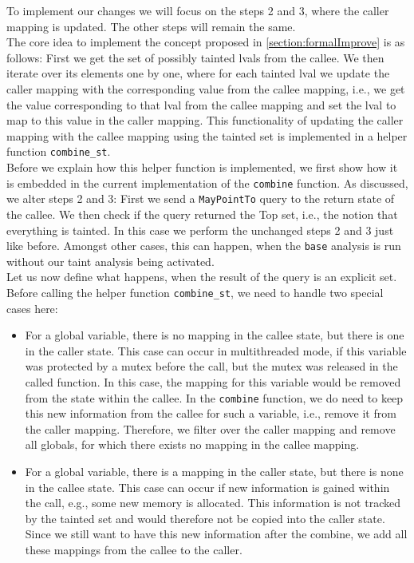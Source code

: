    To implement our changes we will focus on the steps 2 and 3, where the caller mapping is updated. The other steps will remain the same.\\
    The core idea to implement the concept proposed in \autoref{section:formalImprove} is as follows: First we get the set of possibly tainted \ac{lval}s from the callee. We then iterate over its elements one by one, where for each tainted \ac{lval} we update the caller mapping with the corresponding value from the callee mapping, i.e., we get the value corresponding to that \ac{lval} from the callee mapping and set the \ac{lval} to map to this value in the caller mapping. This functionality of updating the caller mapping with the callee mapping using the tainted set is implemented in a helper function \texttt{combine\_st}.\\
    Before we explain how this helper function is implemented, we first show how it is embedded in the current implementation of the \texttt{combine} function. As discussed, we alter steps 2 and 3: First we send a \texttt{MayPointTo} query to the return state of the callee. We then check if the query returned the Top set, i.e., the notion that everything is tainted. In this case we perform the unchanged steps 2 and 3 just like before. Amongst other cases, this can happen, when the \texttt{base} analysis is run without our taint analysis being activated.\\
    Let us now define what happens, when the result of the query is an explicit set. Before calling the helper function \texttt{combine\_st}, we need to handle two special cases here:
    \begin{itemize}
      \item For a global variable, there is no mapping in the callee state, but there is one in the caller state. This case can occur in multithreaded mode, if this variable was protected by a mutex before the call, but the mutex was released in the called function. In this case, the mapping for this variable would be removed from the state within the callee. In the \texttt{combine} function, we do need to keep this new information from the callee for such a variable, i.e., remove it from the caller mapping. Therefore, we filter over the caller mapping and remove all globals, for which there exists no mapping in the callee mapping.

      \item For a global variable, there is a mapping in the caller state, but there is none in the callee state. This case can occur if new information is gained within the call, e.g., some new memory is allocated. This information is not tracked by the tainted set and would therefore not be copied into the caller state. Since we still want to have this new information after the combine, we add all these mappings from the callee to the caller.
    \end{itemize}

